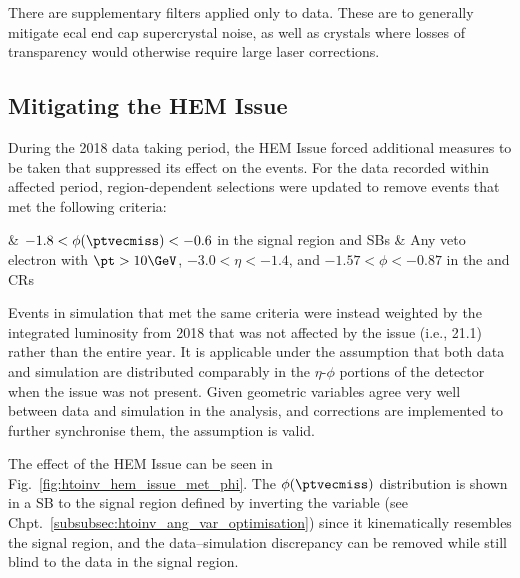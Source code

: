 \medskip

\noindent{}There are supplementary filters applied only to data. These are to generally mitigate \acrshort{ecal} end cap supercrystal noise, as well as crystals where losses of transparency would otherwise require large laser corrections.




\subsection{Mitigating the HEM Issue}
\label{subsec:htoinv_hem_mitigation}

During the 2018 data taking period, the HEM Issue forced additional measures to be taken that suppressed its effect on the events. For the data recorded within affected period, region-dependent selections were updated to remove events that met the following criteria:
\medskip
\begin{easylist}[itemize]
    \cutflowlistprops
    & $-\text{1.8} < \phi(\ptvecmiss) < -\text{0.6}$ in the signal region and \glspl{SB}
    & Any veto electron \vetoEle with $\pt > \text{10}\GeV$, $-\text{3.0} < \eta < -\text{1.4}$, and $-\text{1.57} < \phi < -\text{0.87}$ in the \singleEleCr and \doubleEleCr \glspl{CR}
\end{easylist}

\medskip

\noindent{}Events in simulation that met the same criteria were instead weighted by the integrated luminosity from 2018 that was not affected by the issue (i.e., 21.1\fbinv) rather than the entire year. It is applicable under the assumption that both data and simulation are distributed comparably in the $\eta$-$\phi$ portions of the detector when the issue was not present. Given geometric variables agree very well between data and simulation in the analysis, and corrections are implemented to further synchronise them, the assumption is valid.

The effect of the HEM Issue can be seen in Fig.~\ref{fig:htoinv_hem_issue_met_phi}. The $\phi(\ptvecmiss)$ distribution is shown in a \gls{SB} to the signal region defined by inverting the \omegaTilde variable (see Chpt.~\ref{subsubsec:htoinv_ang_var_optimisation}) since it kinematically resembles the signal region, and the data--simulation discrepancy can be removed while still blind to the data in the signal region.

